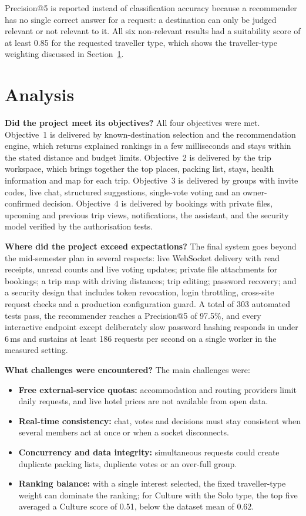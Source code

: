Precision@5 is reported instead of classification accuracy because a
recommender has no single correct answer for a request: a destination can
only be judged relevant or not relevant to it. All six non-relevant results
had a suitability score of at least 0.85 for the requested traveller type,
which shows the traveller-type weighting discussed in
Section~\ref{sec:analysis}.


\section{Analysis}
\label{sec:analysis}

\textbf{Did the project meet its objectives?} All four objectives were met.
Objective~1 is delivered by known-destination selection and the
recommendation engine, which returns explained rankings in a few
milliseconds and stays within the stated distance and budget limits.
Objective~2 is delivered by the trip workspace, which brings together the
top places, packing list, stays, health information and map for each trip.
Objective~3 is delivered by groups with invite codes, live chat, structured
suggestions, single-vote voting and an owner-confirmed decision.
Objective~4 is delivered by bookings with private files, upcoming and
previous trip views, notifications, the assistant, and the security model
verified by the authorisation tests.

\textbf{Where did the project exceed expectations?} The final system goes
beyond the mid-semester plan in several respects: live WebSocket delivery
with read receipts, unread counts and live voting updates; private file
attachments for bookings; a trip map with driving distances; trip editing;
password recovery; and a security design that includes token revocation,
login throttling, cross-site request checks and a production configuration
guard. A total of 303 automated tests pass, the recommender reaches a
Precision@5 of 97.5\%, and every interactive endpoint except deliberately
slow password hashing responds in under 6\,ms and sustains at least
186 requests per second on a single worker in the measured setting.

\textbf{What challenges were encountered?} The main challenges were:
\begin{itemize}
  \item \textbf{Free external-service quotas:} accommodation and routing
    providers limit daily requests, and live hotel prices are not available
    from open data.
  \item \textbf{Real-time consistency:} chat, votes and decisions must stay
    consistent when several members act at once or when a socket
    disconnects.
  \item \textbf{Concurrency and data integrity:} simultaneous requests could
    create duplicate packing lists, duplicate votes or an over-full group.
  \item \textbf{Ranking balance:} with a single interest selected, the fixed
    traveller-type weight can dominate the ranking; for Culture with the
    Solo type, the top five averaged a Culture score of 0.51, below the
    dataset mean of 0.62.
\end{itemize}

